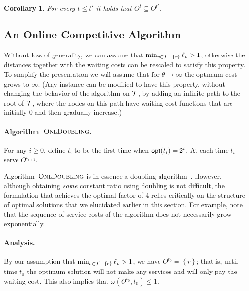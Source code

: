 \documentclass[a4paper]{article}
\newtheorem{corollary}[theorem]{Corollary}
\newcommand{\calT}{{\cal T}}
\newcommand{\braced}[1]{{ \left\{ #1 \right\} }}
\newcommand{\opt}{\mbox{\rm\textsf{opt}}}
\newcommand{\length}{\ell}
\newcommand{\algDoubling}{\mbox{\sc OnlDoubling}}
\newcommand{\expiration}{\theta}
\begin{document}
\begin{corollary}\label{cor:optima-grow}
For every $t \leq t'$ it holds that $O^t \subseteq O^{t'}$.
\end{corollary}





\subsection{An Online Competitive Algorithm}  

Without loss of generality, we can assume that
$\min_{v\in\calT-\braced{r}} \length_v > 1$; otherwise the distances
together with the waiting costs can be rescaled to satisfy this
property. To simplify the presentation we will assume that for
$\expiration\to\infty$ the optimum cost grows to $\infty$.  (Any
instance can be modified to have this property, without changing the
behavior of the algorithm on $\calT$, by adding an infinite path to
the root of $\calT$, where the nodes on this path have waiting cost
functions that are initially $0$ and then gradually increase.)


\paragraph{Algorithm~$\algDoubling$.}
For any $i\ge 0$, define $t_i$ to be the first time when $\opt(t_i) = 2^i$.
At each time $t_i$ serve $O^{t_{i+1}}$.

\smallskip

Algorithm~$\algDoubling$ is in essence a doubling algorithm~\cite{doubling-sigact}. However, although 
obtaining \emph{some} constant ratio using doubling is not difficult, the formulation that achieves 
the optimal factor of $4$ relies critically on the structure of optimal solutions that we elucidated 
earlier in this section. For example, note that the sequence of service costs of the algorithm 
does not necessarily grow exponentially.


\paragraph{Analysis.}

By our assumption that $\min_{v\in\calT-\braced{r}} \length_v > 1$, we have
$O^{t_0} = \braced{r}$; that is, until time $t_0$ the optimum solution will not make any services and will
only pay the waiting cost. This also implies that $\omega(O^{t_0},t_0)\le 1$.
\end{document}
